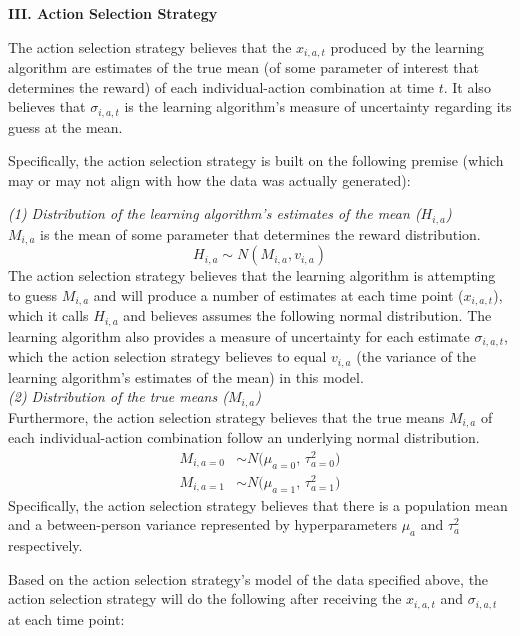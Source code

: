 \documentclass[letterpaper, 11pt]{extarticle}
\begin{document}
\textsf{\textbf {III. Action Selection Strategy}}

The action selection strategy believes that the $x_{i,a,t}$ produced by the learning algorithm are estimates of the true mean (of some parameter of interest that determines the reward) of each individual-action combination at time $t$. It also believes that $\sigma_{i,a,t}$ is the learning algorithm's measure of uncertainty regarding its guess at the mean. 

Specifically, the action selection strategy is built on the following premise (which may or may not align with how the data was actually generated):

\begin{problem}

\textit{(1) Distribution of the learning algorithm's estimates of the mean ($H_{i,a}$)}\\

$M_{i,a}$ is the mean of some parameter that determines the reward distribution. 
$$H_{i,a} \sim N(M_{i,a}, v_{i,a})$$
The action selection strategy believes that the learning algorithm is attempting to guess $M_{i,a}$ and will produce a number of estimates at each time point ($x_{i,a,t}$), which it calls $H_{i,a}$ and believes assumes the following normal distribution. The learning algorithm also provides a measure of uncertainty for each estimate $\sigma_{i,a,t}$, which the action selection strategy believes to equal $v_{i,a}$ (the variance of the learning algorithm's estimates of the mean) in this model.\\

\textit{(2) Distribution of the true means ($M_{i,a}$)}\\

Furthermore, the action selection strategy believes that the true means $M_{i,a}$ of each individual-action combination follow an underlying normal distribution.
\begin{align*}
    M_{i,{a=0}} &\sim N\!\big(\mu_{a=0}, \, \tau_{a=0}^{2}\big)\\
    M_{i,{a=1}} &\sim N\!\big(\mu_{a=1}, \, \tau_{a=1}^{2}\big)
\end{align*}
Specifically, the action selection strategy believes that there is a population mean and a between-person variance represented by hyperparameters $\mu_{a}$ and $\tau_{a}^{2}$ respectively. 

\end{problem}

Based on the action selection strategy's model of the data specified above, the action selection strategy will do the following after receiving the $x_{i,a,t}$ and $\sigma_{i,a,t}$ at each time point:
\end{document}
